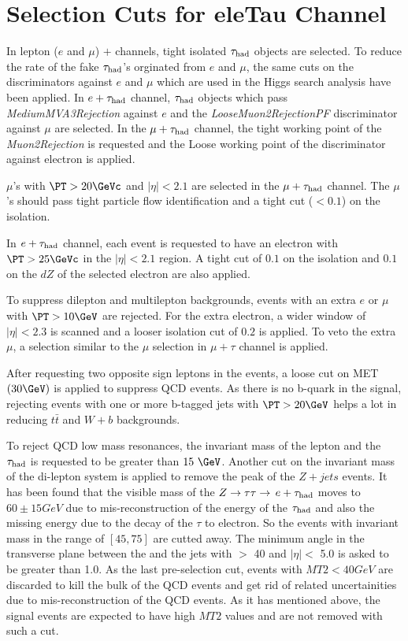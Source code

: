 \section{Selection Cuts for eleTau Channel}
\label{sect:eleTauCuts}
In lepton ($e$ and $\mu$) $+$ \Tau channels, tight isolated $\tau_{\rm had}$ objects are selected. To reduce the rate of the fake $\tau_{\rm had}$'s orginated from $e$ and $\mu$, the same cuts on the discriminators against $e$ and $\mu$ which are used in the Higgs search analysis \cite{CMS_AN_2013-188} have been applied. In $e + \tau_{\rm had}$ channel, $\tau_{\rm had}$ objects which pass \emph{MediumMVA3Rejection} against $e$ and the \emph{LooseMuon2RejectionPF} discriminator against $\mu$ are selected. In the $\mu + \tau_{\rm had}$ channel, the tight working point of the \emph{Muon2Rejection} is requested and the Loose working point of the discriminator against electron is applied.

$\mu$'s with $\PT > 20 \GeVc$ and $|\eta|<2.1$ are selected in the $\mu + \tau_{\rm had}$ channel. The $\mu$'s should pass tight particle flow identification and a tight cut ($<0.1$) on the isolation.
 
In $e + \tau_{\rm had}$ channel, each event is requested to have an electron with $\PT >25 \GeVc$ in the $|\eta| < 2.1 $ region. A tight cut of $0.1$ on the isolation and $0.1$ on the $dZ$ of the selected electron are also applied.

To suppress dilepton and multilepton backgrounds, events with an extra $e$ or $\mu$ with $\PT >10 \GeV$ are rejected. For the extra electron, a wider window of $|\eta|<2.3$ is scanned and a looser isolation cut of $0.2$ is applied. To veto the extra $\mu$, a selection similar to the $\mu$ selection in $\mu+\tau$ channel is applied.

After requesting two opposite sign leptons in the events, a loose cut on MET $(30 \GeV)$ is applied to suppress QCD events. As there is no b-quark in the signal, rejecting events with one or more b-tagged jets with $\PT > 20 \GeV$ helps a lot in reducing $t\bar{t}$ and $W+b$ backgrounds.

To reject QCD low mass resonances, the invariant mass of the lepton and the $\tau_{\rm had}$ is requested to be greater than $15\ \GeV$. Another cut on the invariant mass of the di-lepton system is applied to remove the peak of the $Z+jets$ events. It has been found that the visible mass of the $Z\to\tau\tau\to\,e +\tau_{\rm had}$ moves to $60 \pm 15 GeV$ due to mis-reconstruction of the energy of the $\tau_{\rm had}$ and also the missing energy due to the decay of the $\tau$ to electron. So the events with invariant mass in the range of $[45,75]$ are cutted away. The minimum angle in the transverse plane between the \MET and the jets with \PT $>$ 40 \GeVc and $|\eta| <$ 5.0 is asked to be greater than 1.0. As the last pre-selection cut, events with $MT2<40 GeV$ are discarded to kill the bulk of the QCD events and get rid of related uncertainities due to mis-reconstruction of the QCD events. As it has mentioned above, the signal events are expected to have high $MT2$ values and are not removed with such a cut.

